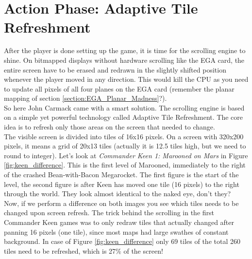 \documentclass[book.tex]{subfiles}
\begin{document}
\section{Action Phase: Adaptive Tile Refreshment}
After the player is done setting up the game, it is time for the scrolling engine to shine. On bitmapped displays without hardware scrolling like the EGA card, the entire screen have to be erased and redrawn in the slightly shifted position whenever the player moved in any direction. This would kill the CPU as you need to update all pixels of all four planes on the EGA card (remember the planar mapping of section \ref{section:EGA_Planar_Madness}?).\\ 

So here John Carmack came with a smart solution. The scrolling engine is based on a simple yet powerful technology called Adaptive Tile Refreshment. The core idea is to  refresh only those areas on the screen that needed to change.\\

The visible screen is divided into tiles of 16x16 pixels. On a screen with 320x200 pixels, it means a grid of 20x13 tiles (actually it is 12.5 tiles high, but we need to round to integer). Let's look at \textit{Commander Keen 1: Marooned on Mars} in Figure \ref{fig:keen_difference}. This is the first level of Marooned, immediately to the right of the crashed Bean-with-Bacon Megarocket. The first figure is the start of the level, the second figure is after Keen has moved one tile (16 pixels) to the right through the world. They look almost identical to the naked eye, don't they? \\

Now, if we perform a difference on both images you see which tiles needs to be changed upon screen refresh. The trick behind the scrolling in the first Commander Keen games was to only redraw tiles that actually changed after panning 16 pixels (one tile), since most maps had large swathes of constant background. In case of Figure \ref{fig:keen_difference} only 69 tiles of the total 260 tiles need to be refreshed, which is 27\% of the screen! 
\end{document}
